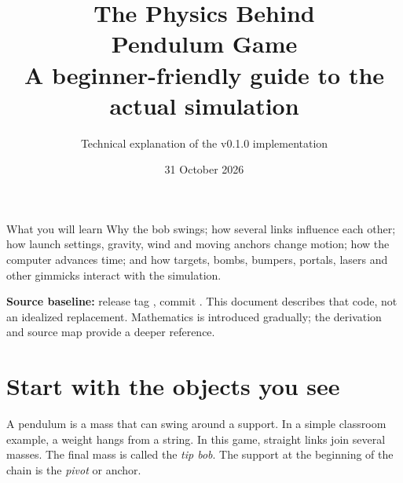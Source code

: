 \documentclass[11pt,a4paper]{article}
\title{\Huge\bfseries The Physics Behind\\Pendulum Game\\[8mm]\Large A beginner-friendly guide to the actual simulation}
\author{Technical explanation of the v0.1.0 implementation}
\date{31 October 2026}
\newcommand{\code}[1]{\texttt{\detokenize{#1}}}
\begin{document}
\begin{titlepage}\maketitle\thispagestyle{empty}
\begin{center}\end{center}
\vfill
\begin{idea}{What you will learn}
Why the bob swings; how several links influence each other; how launch settings, gravity, wind and moving anchors change motion; how the computer advances time; and how targets, bombs, bumpers, portals, lasers and other gimmicks interact with the simulation.
\end{idea}
\textbf{Source baseline:} release tag \code{v0.1.0}, commit \code{6335b08}. This document describes that code, not an idealized replacement. Mathematics is introduced gradually; the derivation and source map provide a deeper reference.
\end{titlepage}
\setcounter{tocdepth}{1}
\tableofcontents\clearpage

\section{Start with the objects you see}
A pendulum is a mass that can swing around a support. In a simple classroom example, a weight hangs from a string. In this game, straight links join several masses. The final mass is called the \emph{tip bob}. The support at the beginning of the chain is the \emph{pivot} or anchor.
\end{document}

